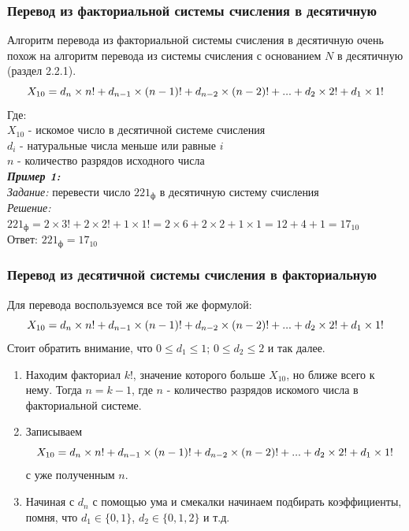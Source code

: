 \subsubsection{Перевод из факториальной системы счисления в десятичную}
Алгоритм перевода из факториальной системы счисления в десятичную очень похож на алгоритм перевода из системы счисления с основанием $N$ в десятичную (раздел 2.2.1).
$$ X_{10} = d_{n}\times n! + d_{n-1}\times (n-1)! + d_{n-2}\hm\times (n-2)!\hm + ...\hm + d_{2}\times 2! + d_{1}\times 1!$$
Где:
\\$X_{10}$ - искомое число в десятичной системе счисления
\\$d_{i}$ - натуральные числа меньше или равные $i$
\\$n$ - количество разрядов исходного числа
\\
\emph{\textbf{Пример 1:}}
\\\emph{Задание:} перевести число $221_{\mbox{ф}}$ в десятичную систему счисления
\\\emph{Решение:} $221_{\mbox{ф}} = 2\times 3! + 2\times 2! + 1\times 1! = 2\times 6 + 2\times 2 + 1\times 1 = 12 + 4 + 1 = 17_{10}$
\\Ответ:  $221_{\mbox{ф}} = 17_{10}$
\subsubsection{Перевод из десятичной системы счисления в факториальную}
Для перевода воспользуемся все той же формулой:
$$ X_{10} = d_{n}\times n! + d_{n-1}\times (n-1)! + d_{n-2}\hm\times (n-2)!\hm + ...\hm + d_{2}\times 2! + d_{1}\times 1!$$
Стоит обратить внимание, что $0 \leqslant d_{1}\leqslant 1$; $0 \leqslant d_{2}\leqslant 2$ и так далее.
\begin{enumerate}
\item Находим факториал $k!$, значение которого больше $X_{10}$, но ближе всего к нему. Тогда $n = k - 1$, где $n$ - количество разрядов искомого числа в факториальной системе.
\item Записываем $$ X_{10} = d_{n}\times n! + d_{n-1}\times (n-1)! + d_{n-2}\hm\times (n-2)!\hm + ...\hm + d_{2}\times 2! + d_{1}\times 1!$$ с уже полученным $n$.
\item Начиная с $d_{n}$ с помощью ума и смекалки начинаем подбирать коэффициенты, помня, что $d_{1} \in \{0,1\}$, $d_{2} \in \{0,1,2\}$ и т.д.
\end{enumerate}

